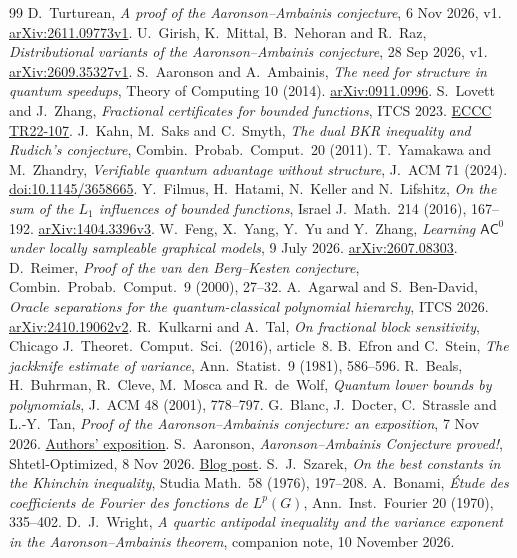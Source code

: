 \documentclass[11pt]{article}
\numberwithin{equation}{section}
\theoremstyle{plain}
\theoremstyle{remark}
\begin{document}
\begin{thebibliography}{99}\small
{} D.~Turturean, \emph{A proof of the Aaronson--Ambainis conjecture}, 6 Nov 2026, v1. \href{https://arxiv.org/abs/2611.09773v1}{arXiv:2611.09773v1}.
 U.~Girish, K.~Mittal, B.~Nehoran and R.~Raz, \emph{Distributional variants of the Aaronson--Ambainis conjecture}, 28 Sep 2026, v1. \href{https://arxiv.org/abs/2609.35327v1}{arXiv:2609.35327v1}.
 S.~Aaronson and A.~Ambainis, \emph{The need for structure in quantum speedups}, Theory of Computing 10 (2014). \href{https://arxiv.org/abs/0911.0996}{arXiv:0911.0996}.
 S.~Lovett and J.~Zhang, \emph{Fractional certificates for bounded functions}, ITCS 2023. \href{https://eccc.weizmann.ac.il/report/2022/107/}{ECCC TR22-107}.
 J.~Kahn, M.~Saks and C.~Smyth, \emph{The dual BKR inequality and Rudich's conjecture}, Combin.\ Probab.\ Comput.\ 20 (2011).
 T.~Yamakawa and M.~Zhandry, \emph{Verifiable quantum advantage without structure}, J.\ ACM 71 (2024). \href{https://doi.org/10.1145/3658665}{doi:10.1145/3658665}.
 Y.~Filmus, H.~Hatami, N.~Keller and N.~Lifshitz, \emph{On the sum of the $L_1$ influences of bounded functions}, Israel J.\ Math.\ 214 (2016), 167--192. \href{https://arxiv.org/abs/1404.3396v3}{arXiv:1404.3396v3}.
 W.~Feng, X.~Yang, Y.~Yu and Y.~Zhang, \emph{Learning $\mathsf{AC}^0$ under locally sampleable graphical models}, 9 July 2026. \href{https://arxiv.org/abs/2607.08303}{arXiv:2607.08303}.
 D.~Reimer, \emph{Proof of the van den Berg--Kesten conjecture}, Combin.\ Probab.\ Comput.\ 9 (2000), 27--32.
 A.~Agarwal and S.~Ben-David, \emph{Oracle separations for the quantum-classical polynomial hierarchy}, ITCS 2026. \href{https://arxiv.org/abs/2410.19062v2}{arXiv:2410.19062v2}.
 R.~Kulkarni and A.~Tal, \emph{On fractional block sensitivity}, Chicago J.\ Theoret.\ Comput.\ Sci.\ (2016), article~8.
 B.~Efron and C.~Stein, \emph{The jackknife estimate of variance}, Ann.\ Statist.\ 9 (1981), 586--596.
 R.~Beals, H.~Buhrman, R.~Cleve, M.~Mosca and R.~de~Wolf, \emph{Quantum lower bounds by polynomials}, J.\ ACM 48 (2001), 778--797.
 G.~Blanc, J.~Docter, C.~Strassle and L.-Y.~Tan, \emph{Proof of the Aaronson--Ambainis conjecture: an exposition}, 7 Nov 2026. \href{https://guyblanc.github.io/AA_Exposition.pdf}{Authors' exposition}.
 S.~Aaronson, \emph{Aaronson--Ambainis Conjecture proved!}, Shtetl-Optimized, 8 Nov 2026. \href{https://scottaaronson.blog/?p=10295}{Blog post}.
 S.~J.~Szarek, \emph{On the best constants in the Khinchin inequality}, Studia Math.\ 58 (1976), 197--208.
 A.~Bonami, \emph{\'Etude des coefficients de Fourier des fonctions de $L^p(G)$}, Ann.\ Inst.\ Fourier 20 (1970), 335--402.
 D.~J.~Wright, \emph{A quartic antipodal inequality and the variance exponent in the Aaronson--Ambainis theorem}, companion note, 10 November 2026.
\end{thebibliography}
\end{document}
